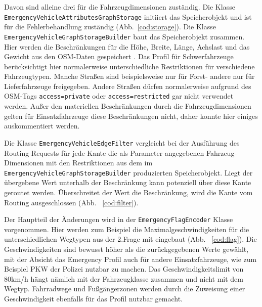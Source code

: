 Davon sind alleine drei für die Fahrzeugdimensionen zuständig.
Die Klasse \texttt{EmergencyVehicleAttributesGraphStorage} initiiert das Speicherobjekt und ist für die Fehlerbehandlung zuständig (Abb.~\ref{cod:storage}).
Die Klasse \texttt{EmergencyVehicleGraphStorageBuilder} baut das Speicherobjekt zusammen. Hier werden die Beschränkungen für die Höhe, Breite, Länge, Achslast und das Gewicht aus den OSM-Daten gespeichert . Das Profil für Schwerfahrzeuge berücksichtigt hier normalerweise unterschiedliche Restriktionen für verschiedene Fahrzeugtypen. Manche Straßen sind beispielsweise nur für Forst- andere nur für Lieferfahrzeuge freigegeben. Andere Straßen dürfen normalerweise aufgrund des OSM-Tags \texttt{access=private} oder \texttt{access=restricted} gar nicht verwendet werden. Außer den materiellen Beschränkungen durch die Fahrzeugdimensionen gelten für Einsatzfahrzeuge diese Beschränkungen nicht, daher konnte hier einiges auskommentiert werden.

% 

Die Klasse \texttt{EmergencyVehicleEdgeFilter} vergleicht bei der Ausführung des Routing Requests für jede Kante die als Parameter angegebenen Fahrzeug-Dimensionen mit den Restriktionen aus dem im \texttt{EmergencyVehicleGraphStorageBuilder} produzierten Speicherobjekt. Liegt der übergebene Wert unterhalb der Beschränkung kann potenziell über diese Kante geroutet werden. Überschreitet der Wert die Beschränkung, wird die Kante vom Routing ausgeschlossen (Abb. ~\ref{cod:filter}).

% 

Der Hauptteil der Änderungen wird in der \texttt{EmergencyFlagEncoder} Klasse vorgenommen. Hier werden zum Beispiel die Maximalgeschwindigkeiten für die unterschiedlichen Wegtypen aus der 2.Frage mit eingebaut (Abb. ~\ref{cod:flag}). Die Geschwindigkeiten sind bewusst höher als die zurückgegebenen Werte gewählt, mit der Absicht das Emergency Profil auch für andere Einsatzfahrzeuge, wie zum Beispiel PKW der Polizei nutzbar zu machen. Das Geschwindigkeitslimit von 80km/h hängt nämlich mit der Fahrzeugklasse zusammen und nicht mit dem Wegtyp. Fahrradwege und Fußgängerzonen werden durch die Zuweisung einer Geschwindigkeit ebenfalls für das Profil nutzbar gemacht. 

